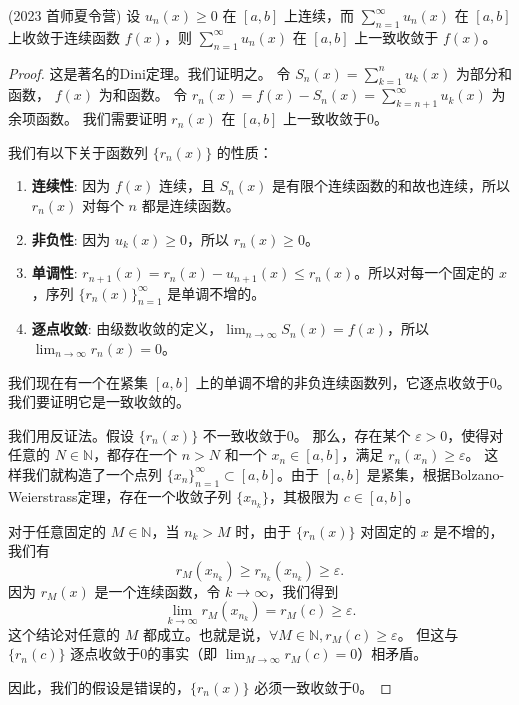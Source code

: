 \documentclass[lang=cn,10pt,thmcnt=section]{elegantbook}
\begin{document}
	\begin{example}
	(2023 首师夏令营) 设 $u_n(x) \geq 0$ 在 $[a,b]$ 上连续，而 $\sum_{n=1}^{\infty} u_n(x)$ 在 $[a,b]$ 上收敛于连续函数 $f(x)$，则 $\sum_{n=1}^{\infty} u_n(x)$ 在 $[a,b]$ 上一致收敛于 $f(x)$。
	\end{example}
	\begin{proof}
		这是著名的Dini定理。我们证明之。
		令 $S_n(x) = \sum_{k=1}^n u_k(x)$ 为部分和函数， $f(x)$ 为和函数。
		令 $r_n(x) = f(x) - S_n(x) = \sum_{k=n+1}^\infty u_k(x)$ 为余项函数。
		我们需要证明 $r_n(x)$ 在 $[a,b]$ 上一致收敛于0。
		
		我们有以下关于函数列 $\{r_n(x)\}$ 的性质：
		\begin{enumerate}
			\item \textbf{连续性}: 因为 $f(x)$ 连续，且 $S_n(x)$ 是有限个连续函数的和故也连续，所以 $r_n(x)$ 对每个 $n$ 都是连续函数。
			\item \textbf{非负性}: 因为 $u_k(x) \ge 0$，所以 $r_n(x) \ge 0$。
			\item \textbf{单调性}: $r_{n+1}(x) = r_n(x) - u_{n+1}(x) \le r_n(x)$。所以对每一个固定的 $x$，序列 $\{r_n(x)\}_{n=1}^\infty$ 是单调不增的。
			\item \textbf{逐点收敛}: 由级数收敛的定义，$\lim_{n \to \infty} S_n(x) = f(x)$，所以 $\lim_{n \to \infty} r_n(x) = 0$。
		\end{enumerate}
		我们现在有一个在紧集 $[a,b]$ 上的单调不增的非负连续函数列，它逐点收敛于0。我们要证明它是一致收敛的。
		
		我们用反证法。假设 $\{r_n(x)\}$ 不一致收敛于0。
		那么，存在某个 $\varepsilon > 0$，使得对任意的 $N \in \mathbb{N}$，都存在一个 $n > N$ 和一个 $x_n \in [a,b]$，满足 $r_n(x_n) \ge \varepsilon$。
		这样我们就构造了一个点列 $\{x_n\}_{n=1}^\infty \subset [a,b]$。由于 $[a,b]$ 是紧集，根据Bolzano-Weierstrass定理，存在一个收敛子列 $\{x_{n_k}\}$，其极限为 $c \in [a,b]$。
		
		对于任意固定的 $M \in \mathbb{N}$，当 $n_k > M$ 时，由于 $\{r_n(x)\}$ 对固定的 $x$ 是不增的，我们有
		\[ r_M(x_{n_k}) \ge r_{n_k}(x_{n_k}) \ge \varepsilon. \]
		因为 $r_M(x)$ 是一个连续函数，令 $k \to \infty$，我们得到
		\[ \lim_{k \to \infty} r_M(x_{n_k}) = r_M(c) \ge \varepsilon. \]
		这个结论对任意的 $M$ 都成立。也就是说，$\forall M \in \mathbb{N}, r_M(c) \ge \varepsilon$。
		但这与 $\{r_n(c)\}$ 逐点收敛于0的事实（即 $\lim_{M \to \infty} r_M(c) = 0$）相矛盾。
		
		因此，我们的假设是错误的，$\{r_n(x)\}$ 必须一致收敛于0。
	\end{proof}
	
\end{document}
